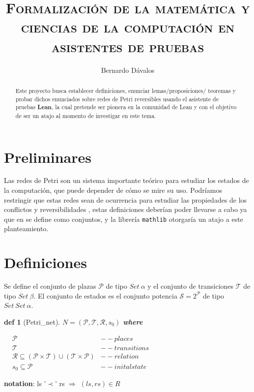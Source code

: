 \documentclass{article}
\title{\textsc{Formalización de la matem\'atica y ciencias de la computación en asistentes de pruebas}\\[0.2em]\smaller{Propuesta: Formalización de Redes de Petri}
}
\author{Bernardo D\'avalos}
\newtheorem{defi}{def}
\newcommand{\Tr}{\mathcal{T}}
\newcommand{\Pl}{\mathcal{P}}
\begin{document}
\maketitle

\begin{abstract}
 Este proyecto busca establecer definiciones, enunciar lemas/proposiciones/ teoremas y probar dichos enunciados sobre redes de Petri reversibles usando el asistente de pruebas \textbf{Lean}, la cual pretende ser pionera en la comunidad de Lean y con el objetivo de ser un atajo al momento de investigar en este tema.
\end{abstract}

\section{Preliminares}

Las redes de Petri son un sistema importante teórico para estudiar los estados de la computación, que puede depender de cómo se mire su uso. Podríamos restringir que estas redes sean de ocurrencia para estudiar las propiedades de los conflictos y reversibilidades \cite[p.~6-18]{reversing}, estas definiciones deberían poder llevarse a cabo ya que en \cite{prob} se define como conjuntos, y la librería \texttt{mathlib} otorgaría un atajo a este planteamiento.

\section{Definiciones}

Se define el conjunto de plazas $\mathcal P$ de tipo $Set \ \alpha$ y el conjunto de transiciones $\mathcal T$ de tipo $Set \ \beta$. El conjunto de estados es el conjunto potencia $\mathcal S=2^{\mathcal P}$ de tipo $Set \ Set \ \alpha$.

\begin{defi}[Petri\_net] $N = (\mathcal P,\mathcal T,\mathcal R,s_0)$ \textbf{ where}

$\begin{array}{lll}
&  \Pl  		& --places\\
&  \Tr  		& --transitions\\
&  \mathcal R\subseteq (\Pl\times \Tr)\cup (\Tr\times \Pl) & --relation \\
& s_0 \subseteq \mathcal P &--inital state
\end{array}$
\end{defi}


\textbf{notation}: ls '$\prec$' rs $\Rightarrow$ $(ls,rs)\in R$ 
\end{document}
